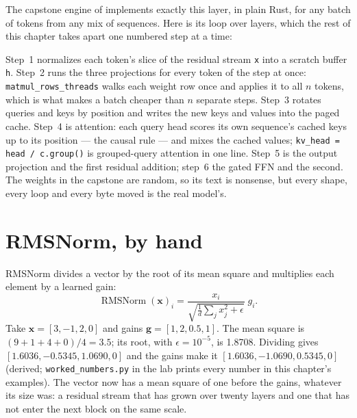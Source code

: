 The capstone engine of  implements exactly this layer, in
plain Rust, for any batch of tokens from any mix of sequences. Here is its loop
over layers, which the rest of this chapter takes apart one numbered step at a
time:


\noindent Step~1 normalizes each token's slice of the residual stream \texttt{x}
into a scratch buffer \texttt{h}. Step~2 runs the three projections for every
token of the step at once: \texttt{matmul\_rows\_threads} walks each weight
row once and applies it to all $n$ tokens, which is what makes a batch cheaper
than $n$ separate steps. Step~3 rotates queries and keys by position and writes
the new keys and values into the paged cache. Step~4 is attention: each query
head scores its own sequence's cached keys up to its position --- the causal
rule --- and mixes the cached values; \texttt{kv\_head = head / c.group()} is
grouped-query attention in one line. Step~5 is the output projection and the
first residual addition; step~6 the gated FFN and the second. The weights in
the capstone are random, so its text is nonsense, but every shape, every loop
and every byte moved is the real model's.

\section{RMSNorm, by hand}

RMSNorm \cite{zhang2019rmsnorm} divides a vector by the root of its mean square
and multiplies each element by a learned gain:
\begin{equation}
\operatorname{RMSNorm}(\mathbf{x})_i = \frac{x_i}{\sqrt{\frac{1}{d}\sum_j x_j^2 + \epsilon}}\; g_i .
\label{eq:rmsnorm}
\end{equation}
Take $\mathbf{x} = [3, -1, 2, 0]$ and gains $\mathbf{g} = [1, 2, 0.5, 1]$. The
mean square is $(9 + 1 + 4 + 0)/4 = 3.5$; its root, with
$\epsilon = 10^{-5}$, is 1.8708. Dividing gives
$[1.6036, -0.5345, 1.0690, 0]$ and the gains make it
$[1.6036, -1.0690, 0.5345, 0]$ (derived; \texttt{worked\_numbers.py} in the lab
prints every number in this chapter's examples). The vector now has a mean
square of one before the gains, whatever its size was: a residual stream that
has grown over twenty layers and one that has not enter the next block on the
same scale.

